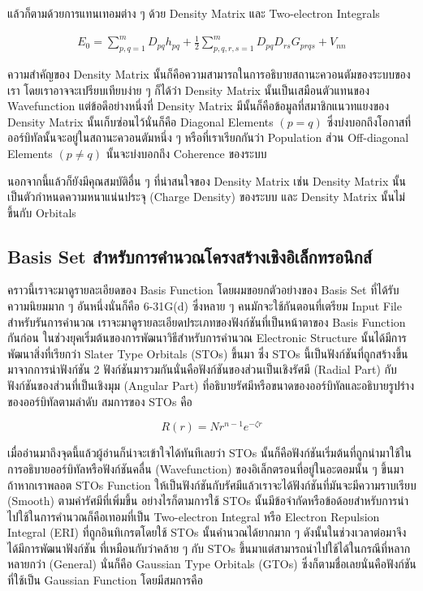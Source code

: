 \noindent แล้วก็ตามด้วยการแทนเทอมต่าง ๆ ด้วย Density Matrix และ Two-electron Integrals

\begin{equation}
    \begin{aligned}
        E_0
        =
        \sum_{p, q=1}^m D_{p q} h_{p q}
        + \frac{1}{2} \sum_{p, q, r, s=1}^m D_{p q} D_{r s} G_{p r q s}+V_{n n}
    \end{aligned}
\end{equation}

ความสำคัญของ Density Matrix นั้นก็คือความสามารถในการอธิบายสถานะควอนตัมของระบบของเรา โดยเราอาจจะเปรียบเทียบง่าย ๆ ก็ได้ว่า
Density Matrix นั้นเป็นเสมือนตัวแทนของ Wavefunction แต่ข้อดีอย่างหนึ่งที่ Density Matrix มีนั้นก็คือข้อมูลที่สมาชิกแนวทแยงของ
Density Matrix นั้นเก็บซ่อนไว้นั่นก็คือ Diagonal Elements $(p = q)$ ซึ่งบ่งบอกถึงโอกาสที่ออร์บิทัลนั้นจะอยู่ในสถานะควอนตัมหนึ่ง ๆ
หรือที่เราเรียกกันว่า Population ส่วน Off-diagonal Elements $(p \neq q)$ นั้นจะบ่งบอกถึง Coherence ของระบบ

นอกจากนี้แล้วก็ยังมีคุณสมบัติอื่น ๆ ที่น่าสนใจของ Density Matrix เช่น Density Matrix นั้นเป็นตัวกำหนดความหนาแน่นประจุ (Charge
Density) ของระบบ และ Density Matrix นั้นไม่ขึ้นกับ Orbitals

\subsection{Basis Set สำหรับการคำนวณโครงสร้างเชิงอิเล็กทรอนิกส์}

คราวนี้เราจะมาดูรายละเอียดของ Basis Function โดยผมขอยกตัวอย่างของ Basis Set ที่ได้รับความนิยมมาก ๆ อันหนึ่งนั่นก็คือ 6-31G(d)
ซึ่งหลาย ๆ คนมักจะใช้กันตอนที่เตรียม Input File สำหรับรันการคำนวณ เราจะมาดูรายละเอียดประเภทของฟังก์ชันที่เป็นหน้าตาของ Basis Function
กันก่อน ในช่วงยุคเริ่มต้นของการพัฒนาวิธีสำหรับการคำนวณ Electronic Structure นั้นได้มีการพัฒนาสิ่งที่เรียกว่า Slater Type Orbitals
(STOs) ขึ้นมา ซึ่ง STOs นี้เป็นฟังก์ชันที่ถูกสร้างขึ้นมาจากการนำฟังก์ชัน 2 ฟังก์ชันมารวมกันนั่นคือฟังก์ชันของส่วนเป็นเชิงรัศมี (Radial Part)
กับฟังก์ชันของส่วนที่เป็นเชิงมุม (Angular Part) ที่อธิบายรัศมีหรือขนาดของออร์บิทัลและอธิบายรูปร่างของออร์บิทัลตามลำดับ สมการของ STOs คือ

\begin{equation}
    \label{eq:sto}
    R(r) = N r^{n - 1} e^{-\zeta r}
\end{equation}

เมื่ออ่านมาถึงจุดนี้แล้วผู้อ่านก็น่าจะเข้าใจได้ทันทีเลยว่า STOs นั้นก็คือฟังก์ชันเริ่มต้นที่ถูกนำมาใช้ในการอธิบายออร์บิทัลหรือฟังก์ชันคลื่น (Wavefunction)
ของอิเล็กตรอนที่อยู่ในอะตอมนั้น ๆ ขึ้นมา ถ้าหากเราพลอต STOs Function ให้เป็นฟังก์ชันกับรัศมีแล้วเราจะได้ฟังก์ชันที่มันจะมีความราบเรียบ (Smooth)
ตามค่ารัศมีที่เพิ่มขึ้น อย่างไรก็ตามการใช้ STOs นั้นมีข้อจำกัดหรือข้อด้อยสำหรับการนำไปใช้ในการคำนวณก็คือเทอมที่เป็น Two-electron Integral
หรือ Electron Repulsion Integral (ERI) ที่ถูกอินทิเกรตโดยใช้ STOs นั้นคำนวณได้ยากมาก ๆ ดังนั้นในช่วงเวลาต่อมาจึงได้มีการพัฒนาฟังก์ชัน%
ที่เหมือนกับว่าคล้าย ๆ กับ STOs ขึ้นมาแต่สามารถนำไปใช้ได้ในกรณีที่หลากหลายกว่า (General) นั่นก็คือ Gaussian Type Orbitals (GTOs)
ซึ่งก็ตามชื่อเลยนั่นคือฟังก์ชันที่ใช้เป็น Gaussian Function โดยมีสมการคือ

